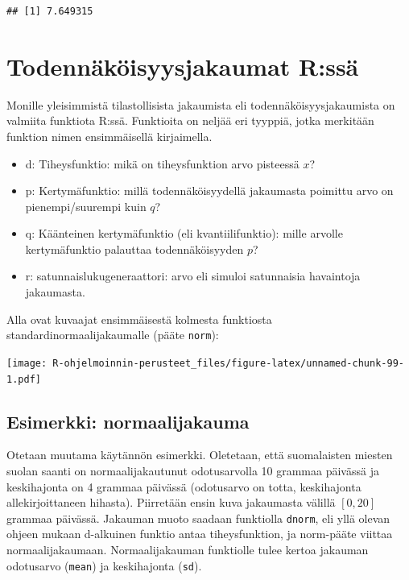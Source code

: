 \documentclass[
]{book}
\providecommand{\tightlist}{%
  \setlength{\itemsep}{0pt}\setlength{\parskip}{0pt}}
\begin{document}
\begin{verbatim}
## [1] 7.649315
\end{verbatim}

\hypertarget{distributions}{%
\chapter{Todennäköisyysjakaumat R:ssä}\label{distributions}}

Monille yleisimmistä tilastollisista jakaumista eli todennäköisyysjakaumista on valmiita funktiota R:ssä. Funktioita on neljää eri tyyppiä, jotka merkitään funktion nimen ensimmäisellä kirjaimella.

\begin{itemize}
\tightlist
\item
  d: Tiheysfunktio: mikä on tiheysfunktion arvo pisteessä \(x\)?
\item
  p: Kertymäfunktio: millä todennäköisyydellä jakaumasta poimittu arvo on pienempi/suurempi kuin \(q\)?
\item
  q: Käänteinen kertymäfunktio (eli kvantiilifunktio): mille arvolle kertymäfunktio palauttaa todennäköisyyden \(p\)?
\item
  r: satunnaislukugeneraattori: arvo eli simuloi satunnaisia havaintoja jakaumasta.
\end{itemize}

Alla ovat kuvaajat ensimmäisestä kolmesta funktiosta standardinormaalijakaumalle (pääte \texttt{norm}):

\texttt{[image: R-ohjelmoinnin-perusteet\_files/figure-latex/unnamed-chunk-99-1.pdf]}

\hypertarget{esimerkki-normaalijakauma}{%
\section{Esimerkki: normaalijakauma}\label{esimerkki-normaalijakauma}}

Otetaan muutama käytännön esimerkki. Oletetaan, että suomalaisten miesten suolan saanti on normaalijakautunut odotusarvolla 10 grammaa päivässä ja keskihajonta on 4 grammaa päivässä (odotusarvo on totta, keskihajonta allekirjoittaneen hihasta). Piirretään ensin kuva jakaumasta välillä \([0, 20]\) grammaa päivässä. Jakauman muoto saadaan funktiolla \texttt{dnorm}, eli yllä olevan ohjeen mukaan d-alkuinen funktio antaa tiheysfunktion, ja norm-pääte viittaa normaalijakaumaan. Normaalijakauman funktiolle tulee kertoa jakauman odotusarvo (\texttt{mean}) ja keskihajonta (\texttt{sd}).
\end{document}
